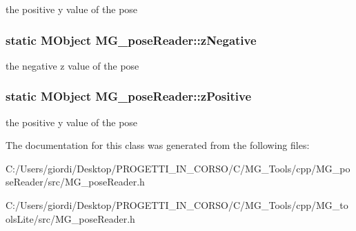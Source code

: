 the positive y value of the pose \hypertarget{class_m_g__pose_reader_aff4a284d37e399e1b3a8d1dbea31c3bc}{
\subsubsection[{z\-Negative}]{\setlength{\rightskip}{0pt plus 5cm}static M\-Object M\-G\-\_\-pose\-Reader\-::z\-Negative\hspace{0.3cm}{\ttfamily [static]}}}\label{class_m_g__pose_reader_aff4a284d37e399e1b3a8d1dbea31c3bc}
the negative z value of the pose \hypertarget{class_m_g__pose_reader_aef81fc58368214f0e34421990e6b53f8}{
\subsubsection[{z\-Positive}]{\setlength{\rightskip}{0pt plus 5cm}static M\-Object M\-G\-\_\-pose\-Reader\-::z\-Positive\hspace{0.3cm}{\ttfamily [static]}}}\label{class_m_g__pose_reader_aef81fc58368214f0e34421990e6b53f8}
the positive y value of the pose 

The documentation for this class was generated from the following files\-:\begin{DoxyCompactItemize}
\item 
C\-:/\-Users/giordi/\-Desktop/\-P\-R\-O\-G\-E\-T\-T\-I\-\_\-\-I\-N\-\_\-\-C\-O\-R\-S\-O/\-C/\-M\-G\-\_\-\-Tools/cpp/\-M\-G\-\_\-pose\-Reader/src/M\-G\-\_\-pose\-Reader.\-h\item 
C\-:/\-Users/giordi/\-Desktop/\-P\-R\-O\-G\-E\-T\-T\-I\-\_\-\-I\-N\-\_\-\-C\-O\-R\-S\-O/\-C/\-M\-G\-\_\-\-Tools/cpp/\-M\-G\-\_\-tools\-Lite/src/M\-G\-\_\-pose\-Reader.\-h\end{DoxyCompactItemize}
